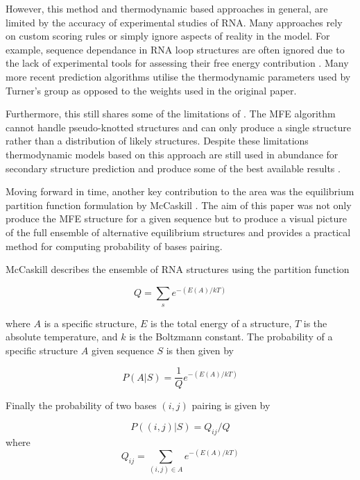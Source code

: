 \documentclass[journal]{IEEEtran}
\begin{document}
However, this method and thermodynamic based approaches in general, are limited by the accuracy of experimental studies of RNA. Many approaches rely on custom scoring rules or simply ignore aspects of reality in the model. For example, sequence dependance in RNA loop structures are often ignored due to the lack of experimental tools for assessing their free energy contribution \cite{do2006contrafold}. Many more recent prediction algorithms utilise the thermodynamic parameters used by Turner's group \cite{mathews1999expanded} as opposed to the weights used in the original paper. 

Furthermore, this still shares some of the limitations of \cite{nussinov1980fast}. The MFE algorithm cannot handle pseudo-knotted structures and can only produce a single structure rather than a distribution of likely structures. Despite these limitations thermodynamic models based on this approach are still used in abundance for secondary structure prediction and produce some of the best available results \cite{laing2010computational} \cite{rivas2013four}.

Moving forward in time, another key contribution to the area was the equilibrium partition function formulation by McCaskill \cite{mccaskill1990equilibrium}. The aim of this paper was not only produce the MFE structure for a given sequence but to produce a visual picture of the full ensemble of alternative equilibrium structures and provides a practical method for computing probability of bases pairing. 

McCaskill describes the ensemble of RNA structures using the partition function

\begin{equation}
	Q = \sum_s e^{-(E(A)/kT)}
\end{equation} 

where $A$ is a specific structure, $E$ is the total energy of a structure, $T$ is the absolute temperature, and $k$ is the Boltzmann constant. The probability of a specific structure $A$ given sequence $S$ is then given by

\begin{equation}
	P(A|S) = \frac{1}{Q} e^{-(E(A)/kT)}	
\end{equation}

Finally the probability of two bases $(i, j)$ pairing is given by

\begin{equation}
	P((i,j)|S) = Q_{ij} / Q
\end{equation}
where
\begin{equation}
	Q_{ij} = \sum_{(i,j) \in A} e^{-(E(A)/kT)}
\end{equation}
\end{document}
